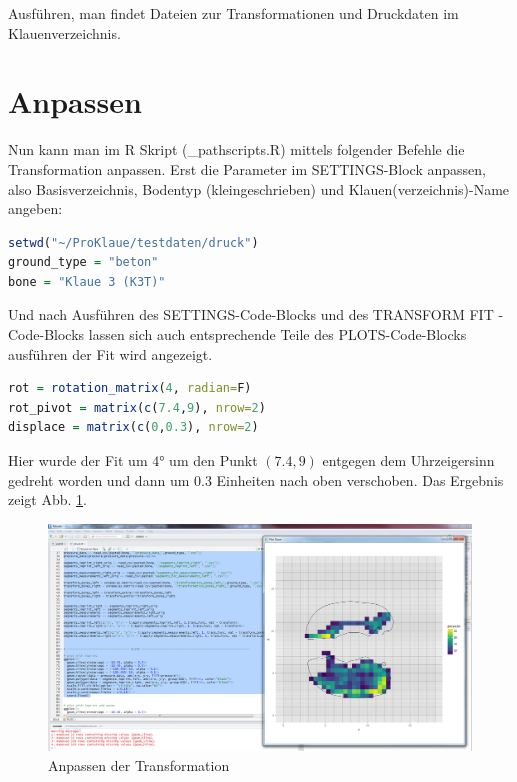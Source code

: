 \documentclass[a4paper, openany, oneside]{memoir}
\begin{document}
Ausführen, man findet Dateien zur Transformationen und Druckdaten im Klauenverzeichnis. 



\section{Anpassen}

Nun kann man im R Skript (\File_path{scripts\druck.R}) mittels folgender Befehle die Transformation anpassen. Erst die Parameter im SETTINGS-Block anpassen, also Basisverzeichnis, Bodentyp (kleingeschrieben) und Klauen(verzeichnis)-Name angeben:

\begin{minipage}[c]{\textwidth}
\begin{lstlisting}[language=R]
setwd("~/ProKlaue/testdaten/druck")
ground_type = "beton"
bone = "Klaue 3 (K3T)"
\end{lstlisting}
\end{minipage}

Und nach Ausführen des SETTINGS-Code-Blocks und des TRANSFORM FIT - Code-Blocks lassen sich auch entsprechende Teile des PLOTS-Code-Blocks ausführen der Fit wird angezeigt.



\begin{minipage}[c]{\textwidth}
\begin{lstlisting}[language=R]
rot = rotation_matrix(4, radian=F)
rot_pivot = matrix(c(7.4,9), nrow=2)
displace = matrix(c(0,0.3), nrow=2)
\end{lstlisting}
\end{minipage}



Hier wurde der Fit um \(4\si{\degree}\) um den Punkt \((7.4, 9)\) entgegen dem Uhrzeigersinn gedreht worden und dann um 0.3 Einheiten nach oben verschoben. Das Ergebnis zeigt Abb. \ref{img_fit_transform}. 

\begin{figure}
\begin{center}
\includegraphics[height = 0.5\textheight, width=1\textwidth,keepaspectratio]{fit_transform.png}
\end{center}
\caption{Anpassen der Transformation}
\label{img_fit_transform}
\end{figure}
\end{document}
